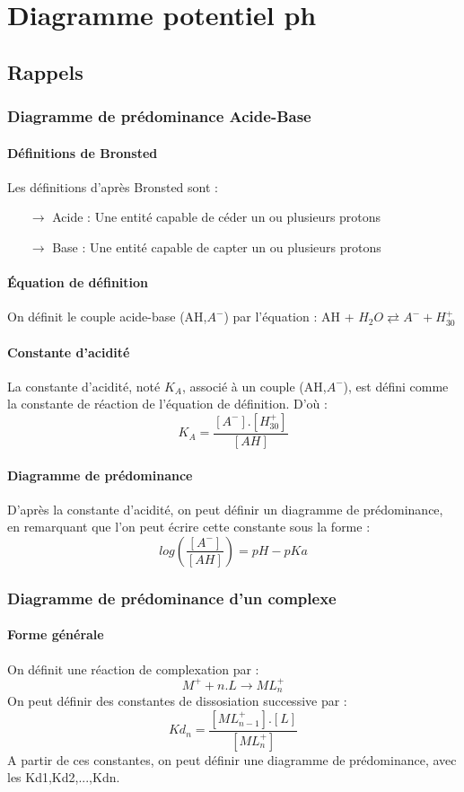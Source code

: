 \chapter{Diagramme potentiel ph}
\section{Rappels}
\subsection{Diagramme de prédominance Acide-Base}
\subsubsection{Définitions de Bronsted}
Les définitions d'après Bronsted sont : 
\begin{itemize}
 \item[$\rightarrow$] Acide : Une entité capable de céder un ou plusieurs protons
 \item[$\rightarrow$] Base : Une entité capable de capter un ou plusieurs protons
\end{itemize}
\subsubsection{Équation de définition}
On définit le couple acide-base (AH,$A^-$) par l'équation : 
AH + $H_2O \rightleftarrows A^- + H_30^+$
\subsubsection{Constante d'acidité}
La constante d'acidité, noté $K_A$, associé à un couple (AH,$A^-$), est défini comme la constante de réaction de l'équation de définition. D'où : 
$$K_A = \dfrac{[A^-].[H_30^+]}{[AH]}$$
\subsubsection{Diagramme de prédominance}
D'après la constante d'acidité, on peut définir un diagramme de prédominance, en remarquant que l'on peut écrire cette constante sous la forme : 
$$log(\dfrac{[A^-]}{[AH]}) = pH - pKa$$
\subsection{Diagramme de prédominance d'un complexe}
\subsubsection{Forme générale}
On définit une réaction de complexation par : 
$$M^+ + n.L \rightarrow ML_n^+$$
On peut définir des constantes de dissosiation successive par : 
$$Kd_n = \dfrac{[ML_{n-1}^+].[L]}{[ML_n^+]}$$
A partir de ces constantes, on peut définir une diagramme de prédominance, avec les Kd1,Kd2,...,Kdn.
